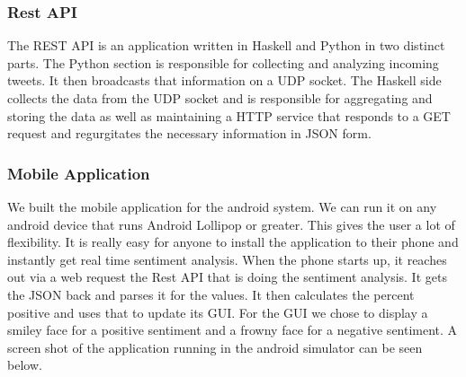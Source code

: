 \documentclass{acm_proc_article-sp}
\begin{document}
\subsubsection{Rest API}

The REST API is an application written in Haskell and Python in two distinct parts. The
Python section is responsible for collecting and analyzing incoming tweets. It then broadcasts
that information on a UDP socket. The Haskell side collects the data from the UDP socket and
is responsible for aggregating and storing the data as well as maintaining a HTTP service that
responds to a GET request and regurgitates the necessary information in JSON form.

\subsubsection{Mobile Application}

We built the mobile application for the android system. We can run it on any
android device that runs Android Lollipop or greater. This gives the user a lot
of flexibility. It is really easy for anyone to install the application to their phone
and instantly get real time sentiment analysis. When the phone starts up, it
reaches out via a web request the Rest API that is doing the sentiment
analysis. It gets the JSON back and parses it for the values. It then
calculates the percent positive and uses that to update its GUI. For the GUI we
chose to display a smiley face for a positive sentiment and a frowny face for a
negative sentiment. A screen shot of the application running in the android simulator
can be seen below.  
\end{document}

